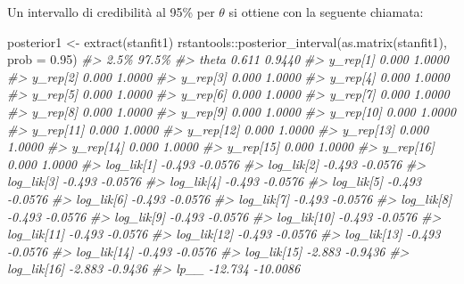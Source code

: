 \documentclass[
  10pt,
  italian,
  a4paper,
  extrafontsizes,onecolumn,openright
  ]{memoir}
\newenvironment{Shaded}{}{}
\newcommand{\AttributeTok}[1]{\textcolor[rgb]{0.49,0.56,0.16}{#1}}
\newcommand{\CommentTok}[1]{\textcolor[rgb]{0.38,0.63,0.69}{\textit{#1}}}
\newcommand{\FloatTok}[1]{\textcolor[rgb]{0.25,0.63,0.44}{#1}}
\newcommand{\FunctionTok}[1]{\textcolor[rgb]{0.02,0.16,0.49}{#1}}
\newcommand{\NormalTok}[1]{#1}
\newcommand{\OtherTok}[1]{\textcolor[rgb]{0.00,0.44,0.13}{#1}}
\newcommand{\SpecialCharTok}[1]{\textcolor[rgb]{0.25,0.44,0.63}{#1}}
\begin{document}
Un intervallo di credibilità al 95\% per \(\theta\) si ottiene con la seguente chiamata:

\begin{Shaded}
\begin{Highlighting}[]
\NormalTok{posterior1 }\OtherTok{\textless{}{-}} \FunctionTok{extract}\NormalTok{(stanfit1)}
\NormalTok{rstantools}\SpecialCharTok{::}\FunctionTok{posterior\_interval}\NormalTok{(}\FunctionTok{as.matrix}\NormalTok{(stanfit1), }\AttributeTok{prob =} \FloatTok{0.95}\NormalTok{)}
\CommentTok{\#\textgreater{}                2.5\%    97.5\%}
\CommentTok{\#\textgreater{} theta         0.611   0.9440}
\CommentTok{\#\textgreater{} y\_rep[1]      0.000   1.0000}
\CommentTok{\#\textgreater{} y\_rep[2]      0.000   1.0000}
\CommentTok{\#\textgreater{} y\_rep[3]      0.000   1.0000}
\CommentTok{\#\textgreater{} y\_rep[4]      0.000   1.0000}
\CommentTok{\#\textgreater{} y\_rep[5]      0.000   1.0000}
\CommentTok{\#\textgreater{} y\_rep[6]      0.000   1.0000}
\CommentTok{\#\textgreater{} y\_rep[7]      0.000   1.0000}
\CommentTok{\#\textgreater{} y\_rep[8]      0.000   1.0000}
\CommentTok{\#\textgreater{} y\_rep[9]      0.000   1.0000}
\CommentTok{\#\textgreater{} y\_rep[10]     0.000   1.0000}
\CommentTok{\#\textgreater{} y\_rep[11]     0.000   1.0000}
\CommentTok{\#\textgreater{} y\_rep[12]     0.000   1.0000}
\CommentTok{\#\textgreater{} y\_rep[13]     0.000   1.0000}
\CommentTok{\#\textgreater{} y\_rep[14]     0.000   1.0000}
\CommentTok{\#\textgreater{} y\_rep[15]     0.000   1.0000}
\CommentTok{\#\textgreater{} y\_rep[16]     0.000   1.0000}
\CommentTok{\#\textgreater{} log\_lik[1]   {-}0.493  {-}0.0576}
\CommentTok{\#\textgreater{} log\_lik[2]   {-}0.493  {-}0.0576}
\CommentTok{\#\textgreater{} log\_lik[3]   {-}0.493  {-}0.0576}
\CommentTok{\#\textgreater{} log\_lik[4]   {-}0.493  {-}0.0576}
\CommentTok{\#\textgreater{} log\_lik[5]   {-}0.493  {-}0.0576}
\CommentTok{\#\textgreater{} log\_lik[6]   {-}0.493  {-}0.0576}
\CommentTok{\#\textgreater{} log\_lik[7]   {-}0.493  {-}0.0576}
\CommentTok{\#\textgreater{} log\_lik[8]   {-}0.493  {-}0.0576}
\CommentTok{\#\textgreater{} log\_lik[9]   {-}0.493  {-}0.0576}
\CommentTok{\#\textgreater{} log\_lik[10]  {-}0.493  {-}0.0576}
\CommentTok{\#\textgreater{} log\_lik[11]  {-}0.493  {-}0.0576}
\CommentTok{\#\textgreater{} log\_lik[12]  {-}0.493  {-}0.0576}
\CommentTok{\#\textgreater{} log\_lik[13]  {-}0.493  {-}0.0576}
\CommentTok{\#\textgreater{} log\_lik[14]  {-}0.493  {-}0.0576}
\CommentTok{\#\textgreater{} log\_lik[15]  {-}2.883  {-}0.9436}
\CommentTok{\#\textgreater{} log\_lik[16]  {-}2.883  {-}0.9436}
\CommentTok{\#\textgreater{} lp\_\_        {-}12.734 {-}10.0086}
\end{Highlighting}
\end{Shaded}
\end{document}
